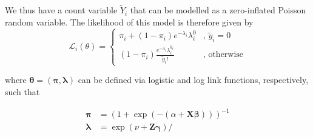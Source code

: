 We thus have a count variable $\widetilde{Y}_i$ that can be modelled as a zero-inflated Poisson random variable. The likelihood of this model is therefore given by 
\begin{equation*}
    \mathcal{L}_i(\theta) = \begin{cases}
    \pi_i + (1-\pi_i) e^{-\lambda_i} \lambda_i^{0} & \text{, $\tilde{y}_i = 0$} \\
    (1-\pi_i) \frac{e^{-\lambda_i} \lambda_i^{y_i}}{\tilde{y}_i!} & \text{, otherwise}
    \end{cases}
\end{equation*}

where $\bm\theta = (\bm\pi, \bm\lambda)$ can be defined via logistic and log link functions, respectively, such that 

\begin{align*}
    \bm\pi &= (1 + \exp(-(\alpha + \bm{X} \bm\beta)))^{-1} \\
    \bm\lambda &= \exp(\nu+ \bm{Z} \bm\gamma)/ 
\end{align*}